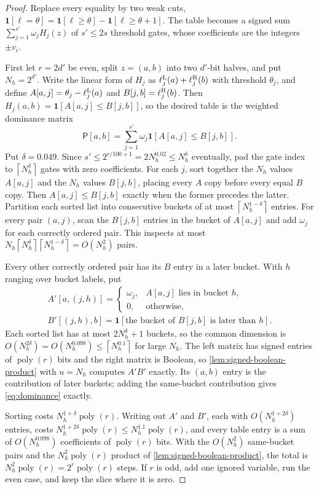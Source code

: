 \documentclass[11pt,letterpaper]{article}
\theoremstyle{definition}
\theoremstyle{remark}
\newcommand{\poly}{\operatorname{poly}}
\newcommand{\ind}{\mathbf 1}
\newcommand{\ceil}[1]{\left\lceil #1\right\rceil}
\begin{document}
\begin{proof}
Replace every equality by two weak cuts,
\(\ind[\ell=\theta]=\ind[\ell\ge\theta]-\ind[\ell\ge\theta+1]\). The table
becomes a signed sum \(\sum_{j=1}^{s'}\omega_jH_j(z)\) of \(s'\le2s\)
threshold gates, whose coefficients are the integers \(\pm v_i\).

First let \(r=2d'\) be even, split \(z=(a,b)\) into two \(d'\)-bit
halves, and put \(N_h=2^{d'}\). Write the linear form of \(H_j\) as
\(\ell_j^{\rm L}(a)+\ell_j^{\rm R}(b)\) with threshold \(\theta_j\), and
define \(A[a,j]=\theta_j-\ell_j^{\rm L}(a)\) and
\(B[j,b]=\ell_j^{\rm R}(b)\). Then \(H_j(a,b)=\ind[A[a,j]\le B[j,b]]\), so
the desired table is the weighted dominance matrix
\begin{equation}\label{eq:dominance}
 \mathsf P[a,b]=\sum_{j=1}^{s'}\omega_j\ind[A[a,j]\le B[j,b]].
\end{equation}
Put \(\delta=0.049\). Since \(s'\le2^{r/100+1}=2N_h^{0.02}\le N_h^\delta\)
eventually, pad the gate index to \(\ceil{N_h^\delta}\) gates with zero
coefficients. For each \(j\), sort together the \(N_h\) values
\(A[a,j]\) and the \(N_h\) values \(B[j,b]\), placing every \(A\) copy
before every equal \(B\) copy. Then \(A[a,j]\le B[j,b]\) exactly when the
former precedes the latter. Partition each sorted list into consecutive
buckets of at most \(\ceil{N_h^{1-\delta}}\) entries. For every pair
\((a,j)\), scan the \(B[j,b]\) entries in the bucket of \(A[a,j]\) and add
\(\omega_j\) for each correctly ordered pair. This inspects at most
\(N_h\ceil{N_h^\delta}\ceil{N_h^{1-\delta}}=O(N_h^2)\) pairs.

Every other correctly ordered pair has its \(B\) entry in a later bucket.
With \(h\) ranging over bucket labels, put
\begin{gather*}
 A'[a,(j,h)]=\begin{cases}\omega_j,&A[a,j]\text{ lies in bucket }h,\\
 0,&\text{otherwise},\end{cases}\\
 B'[(j,h),b]=\ind[\text{the bucket of }B[j,b]\text{ is later than }h].
\end{gather*}
Each sorted list has at most \(2N_h^\delta+1\) buckets, so the common
dimension is \(O(N_h^{2\delta})=O(N_h^{0.098})\le\ceil{N_h^{0.1}}\) for
large \(N_h\). The left matrix has signed entries of \(\poly(r)\) bits and
the right matrix is Boolean, so \cref{lem:signed-boolean-product} with
\(u=N_h\) computes \(A'B'\) exactly. Its \((a,b)\) entry is the
contribution of later buckets; adding the same-bucket contribution gives
\eqref{eq:dominance} exactly.

Sorting costs \(N_h^{1+\delta}\poly(r)\). Writing out \(A'\) and \(B'\), each with \(O(N_h^{1+2\delta})\) entries, costs \(N_h^{1+2\delta}\poly(r)\le N_h^{1.1}\poly(r)\), and every
table entry is a sum of \(O(N_h^{0.098})\) coefficients of \(\poly(r)\)
bits. With the \(O(N_h^2)\) same-bucket pairs and the \(N_h^2\poly(r)\) product of \cref{lem:signed-boolean-product}, the total is \(N_h^2\poly(r)=2^r\poly(r)\) steps. If \(r\) is odd,
add one ignored variable, run the even case, and keep the slice where it
is zero.
\end{proof}
\end{document}
